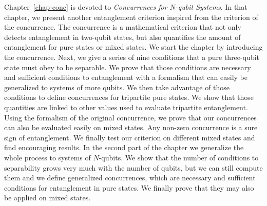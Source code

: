 Chapter~\ref{chap-conc} is devoted to \textit{Concurrences for $N$-qubit Systems}. In that chapter, we present another entanglement criterion inspired from the criterion of the concurrence. The concurrence is a mathematical criterion that not only detects entanglement in two-qubit states, but also quantifies the amount of entanglement for pure states or mixed states. We start the chapter by introducing the concurrence. Next, we give a series of nine conditions that a pure three-qubit state must obey to be separable. We prove that those conditions are necessary and sufficient conditions to entanglement with a formalism that can easily be generalized to systems of more qubits. We then take advantage of those conditions to define concurrences for tripartite pure states. We show that those quantities are linked to other values used to evaluate tripartite entanglement. Using the formalism of the original concurrence, we prove that our concurrences can also be evaluated easily on mixed states. Any non-zero concurrence is a sure sign of entanglement. We finally test our criterion on different mixed states and find encouraging results. In the second part of the chapter we generalize the whole process to systems of $N$-qubits. We show that the number of conditions to separability grows very much with the number of qubits, but we can still compute them and we define generalized concurrences, which are necessary and sufficient conditions for entanglement in pure states. We finally prove that they may also be applied on mixed states.

